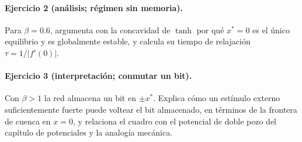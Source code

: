 \paragraph{Ejercicio 2 (análisis; régimen sin memoria).} Para $\beta=0.6$, argumenta con la concavidad de $\tanh$ por qué $x^*=0$ es el único equilibrio y es globalmente estable, y calcula su tiempo de relajación $\tau=1/|f'(0)|$.

\paragraph{Ejercicio 3 (interpretación; conmutar un bit).} Con $\beta>1$ la red almacena un bit en $\pm x^*$. Explica cómo un estímulo externo suficientemente fuerte puede voltear el bit almacenado, en términos de la frontera de cuenca en $x=0$, y relaciona el cuadro con el potencial de doble pozo del capítulo de potenciales y la analogía mecánica.
